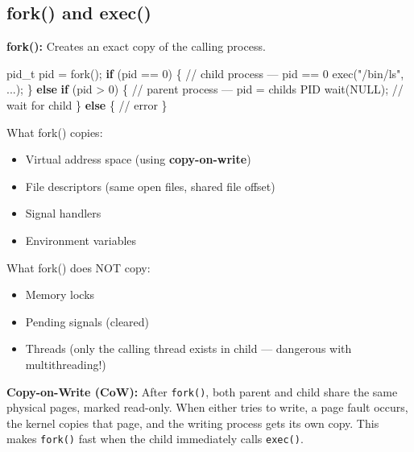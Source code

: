 \documentclass[11pt]{article}
\providecommand{\tightlist}{\setlength{\itemsep}{1pt}\setlength{\parskip}{0pt}}
\newenvironment{Shaded}{\begin{snugshade}}{\end{snugshade}}
\newcommand{\CommentTok}[1]{\textcolor[rgb]{0.48,0.49,0.49}{#1}}
\newcommand{\ControlFlowTok}[1]{\textcolor[rgb]{0.99,0.74,0.29}{\textbf{#1}}}
\newcommand{\DecValTok}[1]{\textcolor[rgb]{0.96,0.45,0.00}{#1}}
\newcommand{\NormalTok}[1]{\textcolor[rgb]{0.81,0.81,0.76}{#1}}
\newcommand{\OperatorTok}[1]{\textcolor[rgb]{0.81,0.81,0.76}{#1}}
\newcommand{\StringTok}[1]{\textcolor[rgb]{0.96,0.31,0.31}{#1}}
\begin{document}
\subsection{fork() and exec()}\label{fork-and-exec}

\textbf{fork():} Creates an exact copy of the calling process.


\begin{Shaded}
\begin{Highlighting}[]
\NormalTok{pid\_t pid }\OperatorTok{=}\NormalTok{ fork}\OperatorTok{();}
\ControlFlowTok{if} \OperatorTok{(}\NormalTok{pid }\OperatorTok{==} \DecValTok{0}\OperatorTok{)} \OperatorTok{\{}
    \CommentTok{// child process — pid == 0}
\NormalTok{    exec}\OperatorTok{(}\StringTok{"/bin/ls"}\OperatorTok{,} \OperatorTok{...);}
\OperatorTok{\}} \ControlFlowTok{else} \ControlFlowTok{if} \OperatorTok{(}\NormalTok{pid }\OperatorTok{\textgreater{}} \DecValTok{0}\OperatorTok{)} \OperatorTok{\{}
    \CommentTok{// parent process — pid = child\textquotesingle{}s PID}
\NormalTok{    wait}\OperatorTok{(}\NormalTok{NULL}\OperatorTok{);}  \CommentTok{// wait for child}
\OperatorTok{\}} \ControlFlowTok{else} \OperatorTok{\{}
    \CommentTok{// error}
\OperatorTok{\}}
\end{Highlighting}
\end{Shaded}

What fork() copies:

\begin{itemize}
\tightlist
\item
  Virtual address space (using \textbf{copy-on-write})
\item
  File descriptors (same open files, shared file offset)
\item
  Signal handlers
\item
  Environment variables
\end{itemize}

What fork() does NOT copy:

\begin{itemize}
\tightlist
\item
  Memory locks
\item
  Pending signals (cleared)
\item
  Threads (only the calling thread exists in child --- dangerous with multithreading!)
\end{itemize}

\textbf{Copy-on-Write (CoW):} After \texttt{fork()}, both parent and child share the same physical pages, marked read-only. When either tries to write, a page fault occurs, the kernel copies that page, and the writing process gets its own copy. This makes \texttt{fork()} fast when the child immediately calls \texttt{exec()}.
\end{document}
